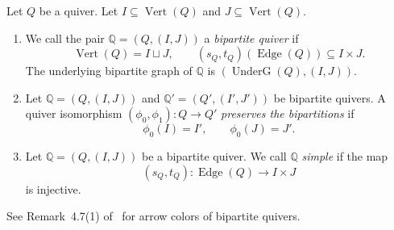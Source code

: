 \begin{definition}\label{def:bipartite-quivers}
Let $Q$ be a quiver. Let $I\subseteq\operatorname{Vert}(Q)$ and $J\subseteq\operatorname{Vert}(Q)$.
\begin{enumerate}[font=\itshape]
\item We call the pair $\mathbb Q=(Q,(I,J))$ a \textit{bipartite quiver} if
\[
 \operatorname{Vert}(Q)=I\sqcup J,\qquad
 (s_Q,t_Q)(\operatorname{Edge}(Q))\subseteq I\times J.
\]
The underlying bipartite graph of $\mathbb Q$ is $(\operatorname{UnderG}(Q),(I,J))$.
\item Let $\mathbb Q=(Q,(I,J))$ and $\mathbb Q'=(Q',(I',J'))$ be bipartite quivers.
A quiver isomorphism $(\phi_0,\phi_1):Q\to Q'$ \textit{preserves the bipartitions} if
\[
 \phi_0(I)=I',\qquad \phi_0(J)=J'.
\]
\item Let $\mathbb Q=(Q,(I,J))$ be a bipartite quiver. We call $\mathbb Q$ \textit{simple} if the map
\[
 (s_Q,t_Q):\operatorname{Edge}(Q)\longrightarrow I\times J
\]
is injective.
\end{enumerate}
\end{definition}

See Remark~4.7(1) of~\cite{Weist} for arrow colors of bipartite quivers.


